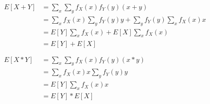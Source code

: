 \documentclass[a4paper,11pt]{article}
\begin{document}
\begin{align*}
 E[X+Y] &= \sum_x \sum_y f_X(x)f_Y(y)(x+y) \\
        &= \sum_x f_X(x) \sum_y f_Y(y)y + \sum_y f_Y(y) \sum_x f_X(x)x \\
        &= E[Y]\sum_x f_X(x) + E[X]\sum_x f_X(x) \\
        &= E[Y] + E[X]\\
\\
\\
 E[X*Y] &= \sum_x \sum_y f_X(x)f_Y(y)(x*y) \\
        &= \sum_x f_X(x)x \sum_y f_Y(y)y \\
        &= E[Y]\sum_x f_X(x)x \\
        &= E[Y] * E[X]
\end{align*}
\end{document}
